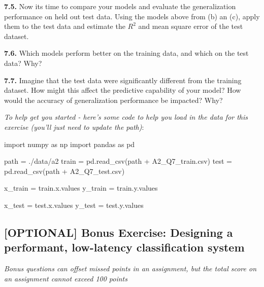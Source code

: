 \documentclass[
  letterpaper,
  DIV=11,
  numbers=noendperiod]{scrartcl}
\newenvironment{Shaded}{\begin{snugshade}}{\end{snugshade}}
\newcommand{\ImportTok}[1]{\textcolor[rgb]{0.00,0.46,0.62}{#1}}
\newcommand{\NormalTok}[1]{\textcolor[rgb]{0.00,0.23,0.31}{#1}}
\newcommand{\OperatorTok}[1]{\textcolor[rgb]{0.37,0.37,0.37}{#1}}
\newcommand{\StringTok}[1]{\textcolor[rgb]{0.13,0.47,0.30}{#1}}
\begin{document}
\textbf{7.5.} Now its time to compare your models and evaluate the
generalization performance on held out test data. Using the models above
from (b) an (c), apply them to the test data and estimate the \(R^2\)
and mean square error of the test dataset.

\textbf{7.6.} Which models perform better on the training data, and
which on the test data? Why?

\textbf{7.7.} Imagine that the test data were significantly different
from the training dataset. How might this affect the predictive
capability of your model? How would the accuracy of generalization
performance be impacted? Why?

\emph{To help get you started - here's some code to help you load in the
data for this exercise (you'll just need to update the path)}:

\begin{Shaded}
\begin{Highlighting}[]
\ImportTok{import}\NormalTok{ numpy }\ImportTok{as}\NormalTok{ np}
\ImportTok{import}\NormalTok{ pandas }\ImportTok{as}\NormalTok{ pd}

\NormalTok{path }\OperatorTok{=} \StringTok{\textquotesingle{}./data/a2\textquotesingle{}}
\NormalTok{train }\OperatorTok{=}\NormalTok{ pd.read\_csv(path }\OperatorTok{+} \StringTok{\textquotesingle{}A2\_Q7\_train.csv\textquotesingle{}}\NormalTok{)}
\NormalTok{test }\OperatorTok{=}\NormalTok{ pd.read\_csv(path }\OperatorTok{+} \StringTok{\textquotesingle{}A2\_Q7\_test.csv\textquotesingle{}}\NormalTok{)}

\NormalTok{x\_train }\OperatorTok{=}\NormalTok{ train.x.values}
\NormalTok{y\_train }\OperatorTok{=}\NormalTok{ train.y.values}

\NormalTok{x\_test }\OperatorTok{=}\NormalTok{ test.x.values}
\NormalTok{y\_test }\OperatorTok{=}\NormalTok{ test.y.values}
\end{Highlighting}
\end{Shaded}

\subsection{{[}OPTIONAL{]} Bonus Exercise: Designing a performant,
low-latency classification
system}\label{optional-bonus-exercise-designing-a-performant-low-latency-classification-system}

\emph{Bonus questions can offset missed points in an assignment, but the
total score on an assignment cannot exceed 100 points}
\end{document}
